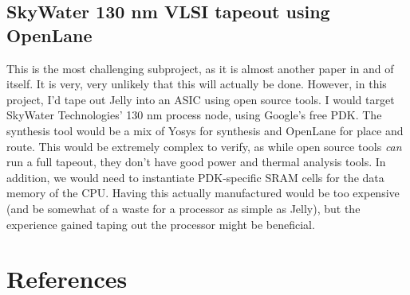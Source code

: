\documentclass{article}
\begin{document}

\subsection{SkyWater 130 nm VLSI tapeout using OpenLane}
This is the most challenging subproject, as it is almost another paper in and of itself. It is very, very 
unlikely that this will actually be done. However, in this project, I'd tape out Jelly into an ASIC using 
open source tools. I would target SkyWater Technologies' 130 nm process node, using Google's free PDK. The 
synthesis tool would be a mix of Yosys for synthesis and OpenLane for place and route. This would be extremely 
complex to verify, as while open source tools \textit{can} run a full tapeout, they don't have good power and 
thermal analysis tools. In addition, we would need to instantiate PDK-specific SRAM cells for the data memory
of the CPU. Having this actually manufactured would be too expensive (and be somewhat of a waste for a processor
as simple as Jelly), but the experience gained taping out the processor might be beneficial.

\section{References}
\printbibliography[heading=none]
\end{document}
